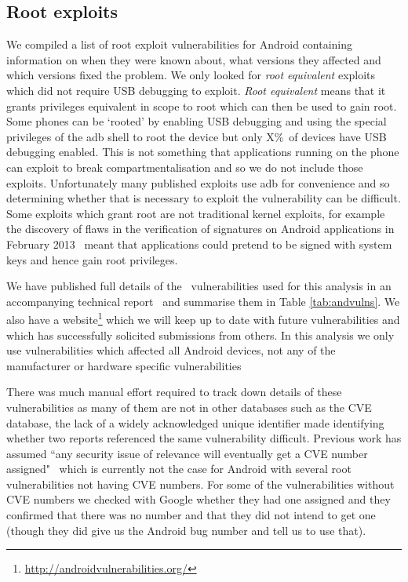 \documentclass[conference,a4paper,twoside]{IEEEtran}
\newcommand{\daAdbPerc}{X\%}
\begin{document}
\subsection{Root exploits}
We compiled a list of root exploit vulnerabilities for Android containing information on when they were known about, what versions they affected and which versions fixed the problem.
We only looked for \emph{root equivalent} exploits which did not require USB debugging to exploit.
\emph{Root equivalent} means that it grants privileges equivalent in scope to root which can then be used to gain root.
Some phones can be `rooted' by enabling USB debugging and using the special privileges of the adb shell to root the device but only \daAdbPerc\ of devices have USB debugging enabled.
This is not something that applications running on the phone can exploit to break compartmentalisation and so we do not include those exploits.
Unfortunately many published exploits use adb for convenience and so determining whether that is necessary to exploit the vulnerability can be difficult.
Some exploits which grant root are not traditional kernel exploits, for example the discovery of flaws in the verification of signatures on Android applications in February 2013~\cite{Forristal2013} meant that applications could pretend to be signed with system keys and hence gain root privileges.

We have published full details of the \daNumVulnsUsed\ vulnerabilities used for this analysis in an accompanying technical report~\cite{TODO} and summarise them in Table \ref{tab:andvulns}.
We also have a website\footnote{\url{http://androidvulnerabilities.org/}} which we will keep up to date with future vulnerabilities and which has successfully solicited submissions from others.
In this analysis we only use vulnerabilities which affected all Android devices, not any of the manufacturer or hardware specific vulnerabilities

There was much manual effort required to track down details of these vulnerabilities as many of them are not in other databases such as the CVE database, the lack of a widely acknowledged unique identifier made identifying whether two reports referenced the same vulnerability difficult.
Previous work has assumed ``any security issue of relevance will eventually get a CVE number assigned"~\cite{Frei2010} which is currently not the case for Android with several root vulnerabilities not having CVE numbers.
For some of the vulnerabilities without CVE numbers we checked with Google whether they had one assigned and they confirmed that there was no number and that they did not intend to get one (though they did give us the Android bug number and tell us to use that).
\end{document}
